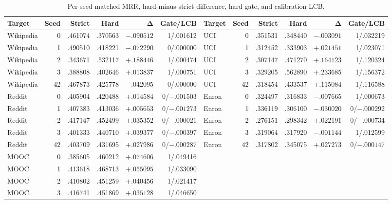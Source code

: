 \documentclass[journal]{IEEEtran}
\begin{document}
\begin{table}[t]
\centering
\caption{Per-seed matched MRR, hard-minus-strict difference, hard gate, and calibration LCB.}
\label{tab:hrcsr_per_seed}
\footnotesize
\setlength{\tabcolsep}{3.4pt}
\begin{tabular}{lrrrrr@{\qquad}lrrrrr}
\toprule
\textbf{Target} & \textbf{Seed} & \textbf{Strict} & \textbf{Hard} & $\boldsymbol{\Delta}$ & \textbf{Gate/LCB} &
\textbf{Target} & \textbf{Seed} & \textbf{Strict} & \textbf{Hard} & $\boldsymbol{\Delta}$ & \textbf{Gate/LCB} \\
\midrule
Wikipedia & 0  & .461074 & .370563 & $-.090512$ & 1/.001612 & UCI & 0  & .351531 & .348440 & $-.003091$ & 1/.032219 \\
Wikipedia & 1  & .490510 & .418221 & $-.072290$ & 0/.000000 & UCI & 1  & .312452 & .333903 & $+.021451$ & 1/.023071 \\
Wikipedia & 2  & .343671 & .532117 & $+.188446$ & 1/.000474 & UCI & 2  & .307147 & .471270 & $+.164123$ & 1/.120324 \\
Wikipedia & 3  & .388808 & .402646 & $+.013837$ & 1/.000751 & UCI & 3  & .329205 & .562890 & $+.233685$ & 1/.156372 \\
Wikipedia & 42 & .467873 & .425778 & $-.042095$ & 0/.000000 & UCI & 42 & .318454 & .433537 & $+.115084$ & 1/.116588 \\
\midrule
Reddit & 0  & .405904 & .420488 & $+.014584$ & 0/$-.001503$ & Enron & 0  & .324497 & .316833 & $-.007665$ & 1/.000673 \\
Reddit & 1  & .407383 & .413036 & $+.005653$ & 0/$-.001273$ & Enron & 1  & .336119 & .306100 & $-.030020$ & 0/$-.000292$ \\
Reddit & 2  & .417147 & .452499 & $+.035352$ & 0/$-.000021$ & Enron & 2  & .276151 & .298342 & $+.022191$ & 0/$-.000734$ \\
Reddit & 3  & .401333 & .440710 & $+.039377$ & 0/$-.000397$ & Enron & 3  & .319064 & .317920 & $-.001144$ & 1/.012599 \\
Reddit & 42 & .403709 & .431695 & $+.027986$ & 0/$-.000287$ & Enron & 42 & .317802 & .345075 & $+.027273$ & 0/$-.000147$ \\
\midrule
MOOC & 0  & .385605 & .460212 & $+.074606$ & 1/.049416 &  &  &  &  &  &  \\
MOOC & 1  & .413618 & .468713 & $+.055095$ & 1/.033090 &  &  &  &  &  &  \\
MOOC & 2  & .410802 & .451259 & $+.040456$ & 1/.021417 &  &  &  &  &  &  \\
MOOC & 3  & .416741 & .451869 & $+.035128$ & 1/.046650 &  &  &  &  &  &  \\

\end{tabular}
\end{table}
\end{document}
